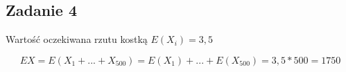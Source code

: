 \subsection{Zadanie 4}
Wartość oczekiwana rzutu kostką $E(X_i) = 3,5$

$$
EX = E(X_1 + ... + X_{500}) = E(X_1) + ... + E(X_{500}) = 3,5 * 500 = 1750
$$

